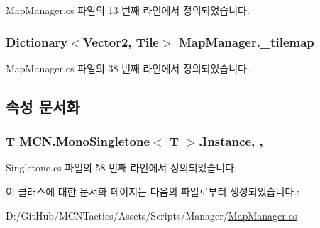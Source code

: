 Map\+Manager.\+cs 파일의 13 번째 라인에서 정의되었습니다.

\subsubsection[{\texorpdfstring{\+\_\+tilemap}{_tilemap}}]{\setlength{\rightskip}{0pt plus 5cm}Dictionary$<$Vector2, {\bf Tile}$>$ Map\+Manager.\+\_\+tilemap\hspace{0.3cm}{\ttfamily [private]}}\hypertarget{class_map_manager_a58f7635d8e19795f3845a3f85e2b4ac3}{}\label{class_map_manager_a58f7635d8e19795f3845a3f85e2b4ac3}


Map\+Manager.\+cs 파일의 38 번째 라인에서 정의되었습니다.



\subsection{속성 문서화}
\subsubsection[{\texorpdfstring{Instance}{Instance}}]{\setlength{\rightskip}{0pt plus 5cm}T {\bf M\+C\+N.\+Mono\+Singletone}$<$ T $>$.Instance\hspace{0.3cm}{\ttfamily [static]}, {\ttfamily [get]}, {\ttfamily [inherited]}}\hypertarget{class_m_c_n_1_1_mono_singletone_aa50c027cca64cf4ad30c1ee5c83e0b78}{}\label{class_m_c_n_1_1_mono_singletone_aa50c027cca64cf4ad30c1ee5c83e0b78}


Singletone.\+cs 파일의 58 번째 라인에서 정의되었습니다.



이 클래스에 대한 문서화 페이지는 다음의 파일로부터 생성되었습니다.\+:\begin{DoxyCompactItemize}
\item 
D\+:/\+Git\+Hub/\+M\+C\+N\+Tactics/\+Assets/\+Scripts/\+Manager/\hyperlink{_map_manager_8cs}{Map\+Manager.\+cs}\end{DoxyCompactItemize}

